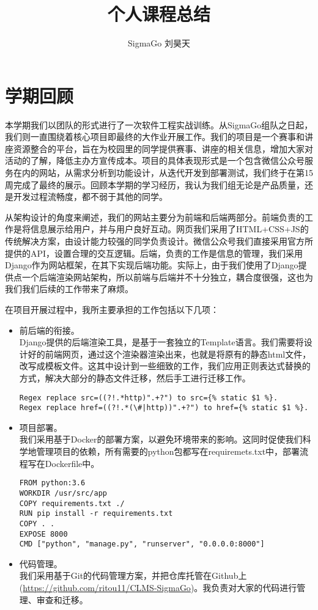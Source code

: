 \documentclass[a4paper,12pt]{article}
\title{个人课程总结}
\author{SigmaGo 刘昊天}
\begin{document}
    \maketitle
    \section{学期回顾} %
    \label{sec:学期回顾}
    本学期我们以团队的形式进行了一次软件工程实战训练。从SigmaGo组队之日起，我们则一直围绕着核心项目即最终的大作业开展工作。我们的项目是一个赛事和讲座资源整合的平台，旨在为校园里的同学提供赛事、讲座的相关信息，增加大家对活动的了解，降低主办方宣传成本。项目的具体表现形式是一个包含微信公众号服务在内的网站，从需求分析到功能设计，从迭代开发到部署测试，我们终于在第15周完成了最终的展示。回顾本学期的学习经历，我认为我们组无论是产品质量，还是开发过程流畅度，都不弱于其他的同学。

    从架构设计的角度来阐述，我们的网站主要分为前端和后端两部分。前端负责的工作是将信息展示给用户，并与用户良好互动。网页我们采用了HTML+CSS+JS的传统解决方案，由设计能力较强的同学负责设计。微信公众号我们直接采用官方所提供的API，设置合理的交互逻辑。后端，负责的工作是信息的管理，我们采用Django作为网站框架，在其下实现后端功能。实际上，由于我们使用了Django提供点一个后端渲染网站架构，所以前端与后端并不十分独立，耦合度很强，这也为我们我们后续的工作带来了麻烦。

    在项目开展过程中，我所主要承担的工作包括以下几项：
    \begin{itemize}[noitemsep,topsep=0pt]
        \item 前后端的衔接。\\
        Django提供的后端渲染工具，是基于一套独立的Template语言。我们需要将设计好的前端网页，通过这个渲染器渲染出来，也就是将原有的静态html文件，改写成模板文件。这其中设计到一些细致的工作，我们应用正则表达式替换的方式，解决大部分的静态文件迁移，然后手工进行迁移工作。
        \begin{lstlisting}
Regex replace src=((?!.*http)".+?") to src={% static $1 %}.
Regex replace href=((?!.*(\#|http))".+?") to href={% static $1 %}.
        \end{lstlisting}
        \item 项目部署。\\
        我们采用基于Docker的部署方案，以避免环境带来的影响。这同时促使我们科学地管理项目的依赖，所有需要的python包都写在requiremets.txt中，部署流程写在Dockerfile中。
        \begin{lstlisting}
FROM python:3.6
WORKDIR /usr/src/app
COPY requirements.txt ./
RUN pip install -r requirements.txt
COPY . .
EXPOSE 8000
CMD ["python", "manage.py", "runserver", "0.0.0.0:8000"]
        \end{lstlisting}
        \item 代码管理。\\
        我们采用基于Git的代码管理方案，并把仓库托管在Github上(\url{https://github.com/ritou11/CLMS-SigmaGo})。我负责对大家的代码进行管理、审查和迁移。
    \end{itemize}
\end{document}
